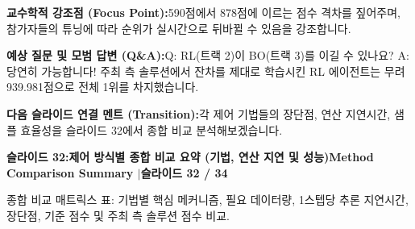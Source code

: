 \documentclass[11pt,a4paper]{article}
\begin{document}
\begin{tcolorbox}[colback=lightbg,colframe=bordergray,left=6pt,right=6pt,top=3pt,bottom=3pt,boxrule=0.6pt,arc=2.5pt]
\small
\noindent\textbf{\color{navy}교수학적 강조점 (Focus Point):}\enspace 590점에서 878점에 이르는 점수 격차를 짚어주며, 참가자들의 튜닝에 따라 순위가 실시간으로 뒤바뀔 수 있음을 강조합니다.\par\vspace{0.3em}
\noindent\textbf{\color{successgreen}예상 질문 및 모범 답변 (Q\&A):}\enspace Q: RL(트랙 2)이 BO(트랙 3)를 이길 수 있나요? A: 당연히 가능합니다! 주최 측 솔루션에서 잔차를 제대로 학습시킨 RL 에이전트는 무려 939.981점으로 전체 1위를 차지했습니다.\par\vspace{0.3em}
\noindent\textbf{\color{accent}다음 슬라이드 연결 멘트 (Transition):}\enspace 각 제어 기법들의 장단점, 연산 지연시간, 샘플 효율성을 슬라이드 32에서 종합 비교 분석해보겠습니다.
\end{tcolorbox}
\clearpage
\hypertarget{slide.32}{}
{}
\noindent\begin{tcolorbox}[colback=navy,colframe=navy,left=6pt,right=6pt,top=3pt,bottom=3pt,boxrule=0pt,arc=2pt]
{\large\bfseries\color{white}슬라이드 32:\enspace 제어 방식별 종합 비교 요약 (기법, 연산 지연 및 성능)}\hfill{\footnotesize\bfseries\color{white!85!lightbg}Method Comparison Summary \enspace$|$\enspace 슬라이드 32 / 34}
\end{tcolorbox}
\vspace{0.2em}
\begin{tcolorbox}[colback=lightbg,colframe=bordergray,title={\footnotesize\bfseries\color{darkgray}슬라이드 시각 구성 요약},fontupper=\small,left=6pt,right=6pt,top=2.5pt,bottom=2.5pt,boxrule=0.6pt,arc=2.5pt]
종합 비교 매트릭스 표: 기법별 핵심 메커니즘, 필요 데이터량, 1스텝당 추론 지연시간, 장단점, 기준 점수 및 주최 측 솔루션 점수 비교.
\end{tcolorbox}
\vspace{0.2em}
\end{document}
